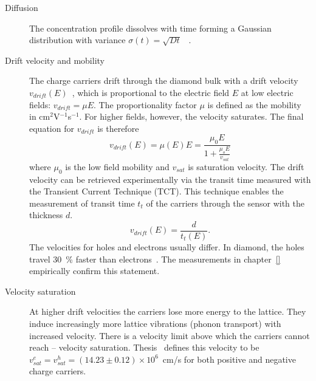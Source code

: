 \documentclass[twoside,12pt]{packages/mytustyle}  %
\begin{document}
\begin{description}

\item[Diffusion]
The concentration profile dissolves with time forming a Gaussian distribution with variance $\sigma(t)=\sqrt{Dt}$~\cite{} .

\item[Drift velocity and mobility]
The charge carriers drift through the diamond bulk with a drift velocity $v_{drift}(E)$~\cite{}, which is proportional to the electric field $E$ at low electric fields: $v_{drift} = \mu E$. The proportionality factor $\mu$ is defined as the mobility in cm$^2$V$^{-1}$s$^{-1}$. For higher fields, however, the velocity saturates. The final equation for $v_{drift}$ is therefore
\begin{equation}
\label{eq:vsat}
v_{drift}(E) = \mu(E)E= \frac{\mu_0 E}{1 + \frac{\mu_o E}{v_{sat}}}
\end{equation}
where $\mu_0$ is the low field mobility and $v_{sat}$ is saturation velocity. The drift velocity can be retrieved experimentally via the transit time measured with the Transient Current Technique (TCT). This technique enables the measurement of transit time $t_t$ of the carriers through the sensor with the thickness $d$. 
\begin{equation}
\label{eq:vsat}
v_{drift}(E) = \frac{d}{t_t(E)}.
\end{equation}
The velocities for holes and electrons usually differ. In diamond, the holes travel 30~\% faster than electrons~\cite{}. The measurements in chapter~\ref{} empirically confirm this statement.

\item[Velocity saturation] At higher drift velocities the carriers lose more energy to the lattice. They induce increasingly more lattice vibrations (phonon transport) with increased velocity. There is a velocity limit above which the carriers cannot reach -- velocity saturation. Thesis~\cite{} defines this velocity to be $v^e_{sat}=v^h_{sat}=(14.23\pm0.12)\times10^6$~cm/s for both positive and negative charge carriers.


\end{description}
\end{document}
